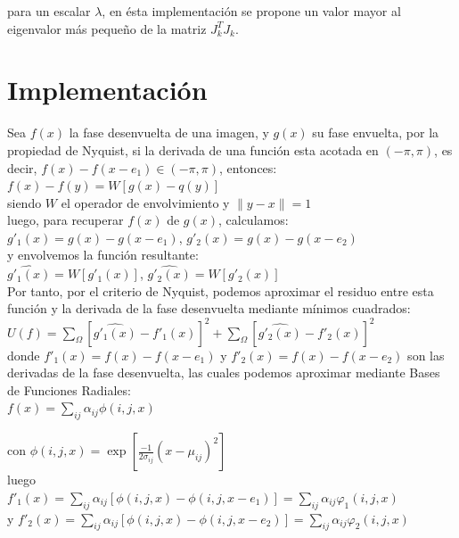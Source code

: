 \documentclass[10pt,journal,compsoc]{styles/IEEEtran}
\begin{document}
para un escalar $\lambda$, en \'esta implementación se propone un valor mayor al eigenvalor m\'as pequeño de la matriz $J_k^T J_k$.\\

\section{Implementaci\'on}

Sea $f(x)$ la fase desenvuelta de una imagen, y $g(x)$ su fase envuelta, por la propiedad de Nyquist, si la derivada de una función esta acotada en $(-\pi,\pi)$, es decir, $f(x)-f(x-e_1) \in (-\pi,\pi)$, entonces:\\

$f(x)-f(y)=W[g(x)-q(y)]$\\

siendo $W$ el operador de envolvimiento y $\parallel y-x \parallel=1$\\

luego, para recuperar $f(x)$ de $g(x)$, calculamos:\\

$g'_1(x)=g(x)-g(x-e_1)$, $g'_2(x)=g(x)-g(x-e_2)$\\

y envolvemos la función resultante:\\

$\widehat{g'_1(x)}=W[g'_1(x)]$, $\widehat{g'_2(x)}=W[g'_2(x)]$\\

Por tanto, por el criterio de Nyquist, podemos aproximar el residuo entre esta función y la derivada de la fase desenvuelta mediante mínimos cuadrados:\\

$U(f)=\sum \limits_{\Omega} [\widehat{g'_1(x)}-f'_1(x)]^2+\sum \limits_{\Omega} [\widehat{g'_2(x)}-f'_2(x)]^2$\\

donde $f'_1(x)=f(x)-f(x-e_1)$ y $f'_2(x)=f(x)-f(x-e_2)$ son las derivadas de la fase desenvuelta, las cuales podemos aproximar mediante Bases de Funciones Radiales:\\

$f(x)=\sum \limits_{ij} \alpha_{ij} \phi(i,j,x)$

con $\phi(i,j,x)=\exp[\frac{-1}{2\sigma_{ij}}(x-\mu_{ij})^2]$\\

luego\\
$f'_1(x)=\sum \limits_{ij}\alpha_{ij}[\phi(i,j,x)-\phi(i,j,x-e_1)]=\sum \limits_{ij}\alpha_{ij}\varphi_1 (i,j,x)$\\
y $f'_2(x)=\sum \limits_{ij}\alpha_{ij}[\phi(i,j,x)-\phi(i,j,x-e_2)]=\sum \limits_{ij}\alpha_{ij}\varphi_2 (i,j,x)$\\
\end{document}
